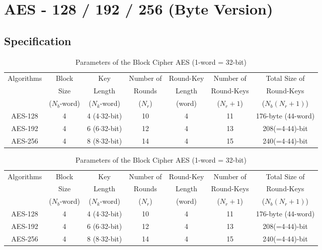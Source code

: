 \chapter{AES - 128 / 192 / 256 (Byte Version)}

\section{Specification}

\begin{table}[h!]\centering\renewcommand{\arraystretch}{1.25} %
	\caption{Parameters of the Block Cipher AES (1-word = 32-bit)}
	\begin{tabular*}{\textwidth}{@{\extracolsep{\fill}}c||cccccc}
		\toprule[1.2pt]
		\multirow{3}{*}{Algorithms} & Block & Key & Number of & Round-Key & Number of & Total Size of\\
		& Size & Length & Rounds &  Length & Round-Keys & Round-Keys \\
		& ($N_b$-word) & ($N_k$-word) & ($N_r$)& (word) & ($N_r+1$)& ($N_b(N_r+1)$)\\
		\hline\hline
		AES-128 & 4 & 4 (4$\cdot$32-bit) & 10 & 4 & 11 & 176-byte (44-word) \\
		AES-192 & 4 & 6 (6$\cdot$32-bit) & 12 & 4 & 13 & 208(=4$\cdot$44)-bit \\
		AES-256 & 4 & 8 (8$\cdot$32-bit) & 14 & 4 & 15 & 240(=4$\cdot$44)-bit \\
		\bottomrule[1.2pt]
	\end{tabular*}
\end{table}

\begin{table}[h!]\centering\renewcommand{\arraystretch}{1.25} %
	\caption{Parameters of the Block Cipher AES (1-word = 32-bit)}
	\begin{tabular*}{\textwidth}{@{\extracolsep{\fill}}c||cccccc}
		\toprule[1.2pt]
		\multirow{3}{*}{Algorithms} & Block & Key & Number of & Round-Key & Number of & Total Size of\\
		& Size & Length & Rounds &  Length & Round-Keys & Round-Keys \\
		& ($N_b$-word) & ($N_k$-word) & ($N_r$)& (word) & ($N_r+1$)& ($N_b(N_r+1)$)\\
		\hline\hline
		AES-128 & 4 & 4 (4$\cdot$32-bit) & 10 & 4 & 11 & 176-byte (44-word) \\
		AES-192 & 4 & 6 (6$\cdot$32-bit) & 12 & 4 & 13 & 208(=4$\cdot$44)-bit \\
		AES-256 & 4 & 8 (8$\cdot$32-bit) & 14 & 4 & 15 & 240(=4$\cdot$44)-bit \\
		\bottomrule[1.2pt]
	\end{tabular*}
\end{table}

